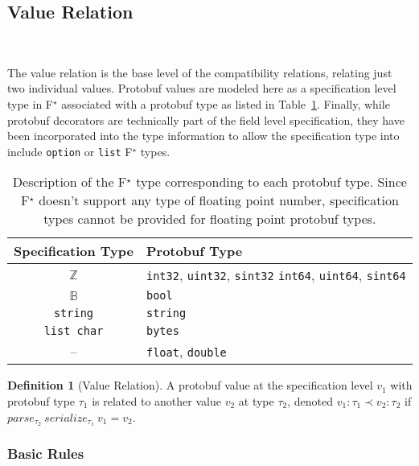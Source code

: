\documentclass[11pt]{article}
\theoremstyle{definition}
\newtheorem{definition}{Definition}[section]
\theoremstyle{plain}
\newcommand{\fstar}{F$^\star$}
\begin{document}
\subsection{Value Relation}~\label{sec:val-rel}

The value relation is the base level of the compatibility relations, relating
just two individual values. Protobuf values are modeled here as a specification
level type in \fstar{} associated with a protobuf type as listed in
Table~\ref{tab:val-spec}. Finally, while protobuf decorators are technically
part of the field level specification, they have been incorporated into the type
information to allow the specification type into include \texttt{option} or
\texttt{list} \fstar{} types.

\begin{table}[H]
	\centering
	\begin{tabular}{cl}
      \toprule
      Specification Type & Protobuf Type \\
      \midrule
      $\mathbb{Z}$ & \texttt{int32}, \texttt{uint32}, \texttt{sint32}
            \texttt{int64}, \texttt{uint64}, \texttt{sint64} \\
      $\mathbb{B}$ & \texttt{bool}    \\
      \texttt{string} & \texttt{string}    \\
      \texttt{list char}  & \texttt{bytes}    \\
      -- & \texttt{float}, \texttt{double} \\
      \bottomrule
	\end{tabular}

	\vspace{4mm}
	\caption[]{Description of the \fstar{} type corresponding to each protobuf
      type. Since \fstar{} doesn't support any type of floating point number,
      specification types cannot be provided for floating point protobuf types.}\label{tab:val-spec}
\end{table}

\begin{definition}[Value Relation]
  A protobuf value at the specification level $v_1$ with protobuf type $\tau_1$ is
  related to another value $v_2$ at type $\tau_2$, denoted $v_1 : \tau_1 \prec v_2 : \tau_2$
  if $parse_{\tau_2}\ serialize_{\tau_1}\ v_1 = v_2$.
\end{definition}

\subsubsection{Basic Rules}
\end{document}

